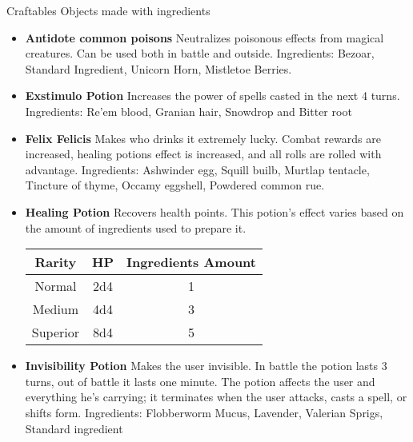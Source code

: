 Craftables
Objects made with ingredients

\begin{itemize}
    \item \textbf{Antidote common poisons}
 Neutralizes poisonous effects from magical creatures. Can be used both in battle and outside.
 Ingredients: Bezoar, Standard Ingredient, Unicorn Horn, Mistletoe Berries.
    

    \item \textbf{Exstimulo Potion}
Increases the power of spells casted in the next 4 turns.
Ingredients: Re'em blood, Granian hair, Snowdrop and Bitter root

    \item \textbf{Felix Felicis}
Makes who drinks it extremely lucky. Combat rewards are increased, healing potions effect is increased, and all rolls are rolled with advantage.
Ingredients: Ashwinder egg, Squill builb, Murtlap tentacle, Tincture of thyme, Occamy eggshell, Powdered common rue.
    
	\item \textbf{Healing Potion}
 Recovers health points. This potion's effect varies based on the amount of ingredients used to prepare it. %

\begin{tabular}{ |c|c|c } 
\hline
\textbf{Rarity} & \textbf{HP}  & \textbf{Ingredients Amount} \\
\hline
Normal  & 2d4  & 1 \\
\hline
Medium  & 4d4 & 3\\
\hline
Superior  & 8d4 & 5\\
\hline
\end{tabular}


 \item \textbf{Invisibility Potion}
Makes the user invisible. In battle the potion lasts 3 turns, out of battle it lasts one minute. The potion affects the user and everything he's carrying; it terminates when the user attacks, casts a spell, or shifts form.
Ingredients: Flobberworm Mucus, Lavender, Valerian Sprigs, Standard ingredient
\end{itemize}

